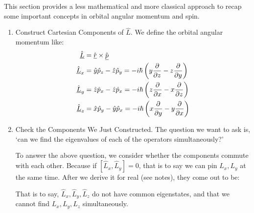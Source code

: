 \documentclass{school-22.101-notes}
\begin{document}
\clearpage
{}
This section provides a less mathematical and more classical approach to recap some important concepts in orbital angular momentum and spin. 
\begin{enumerate}
\item Construct Cartesian Components of $\hat{L}$. 
We define the orbital angular momentum like:
\begin{align}
\hat{\underline{L}} &= \hat{\underline{r}} \times \hat{\underline{p}} \\
\hat{\underline{L}}_x &= \hat{y} \hat{p}_z - \hat{z} \hat{p}_y = - i\hbar \left( y \frac{\partial}{\partial z} - z \frac{\partial}{\partial y} \right) \\
\hat{\underline{L}}_y &= \hat{z} \hat{p}_x - \hat{z} \hat{p}_x = - i\hbar \left( z \frac{\partial}{\partial x} - x \frac{\partial}{\partial z} \right) \\
\hat{\underline{L}}_z &= \hat{x} \hat{p}_y - \hat{y} \hat{p}_x = - i\hbar \left( x \frac{\partial}{\partial y} - y \frac{\partial}{\partial x} \right) 
\end{align}

\item Check the Components We Just Constructed. 
The question we want to ask is, `can we find the eigenvalues of each of the operators simultaneously?'

To answer the above question, we consider whether the components commute with each other. Because if $\left[ \hat{L}_x, \hat{L}_y \right] = 0$, that is to say we can pin $L_x, L_y$ at the same time. After we derive it for real (see notes), they come out to be:

That is to say, $\hat{L}_x, \hat{L}_y, \hat{L}_z$ do not have common eigenstates, and that we cannot find $L_x, L_y, L_z$ simultaneously. 


\end{enumerate}
\end{document}
